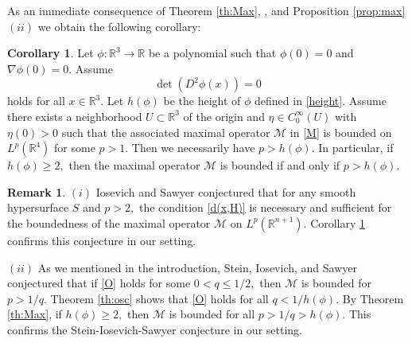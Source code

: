 \documentclass[a4paper, 11pt]{article}
\theoremstyle{plain}
\theoremstyle{definition}
\theoremstyle{lemma}
\theoremstyle{Remark}
\newtheorem{Remark}[theorem]{Remark}
\theoremstyle{proposition}
\theoremstyle{corollary}
\newtheorem{corollary}[theorem]{Corollary}
\theoremstyle{example}
\theoremstyle{assumption}
\begin{document}
  As an immediate consequence of Theorem \ref{th:Max}, \cite[Theorem 2]{Io.Saw}, and Proposition \ref{prop:max} $(ii)$ we obtain the following corollary:
  \begin{corollary}\label{cor:max}
  Let $\phi:\mathbb{R}^3\to \mathbb{R}$ be a polynomial such that $\phi(0)=0$ and $\nabla\phi(0)=0.$ Assume
$$\det(D^2\phi(x))=0$$
holds for all $x\in \mathbb{R}^3.$ Let $h(\phi)$ be the height of $\phi$ defined in \eqref{height}. Assume there exists a neighborhood $U\subset \mathbb{R}^3$ of the origin and  $\eta\in C^{\infty}_0(U)$ with $\eta(0)>0$ such that the associated maximal operator $\mathcal{M}$ in \eqref{M} is bounded
on  $L^p(\mathbb{R}^4)$ for some  $p> 1. $ Then we necessarily have  $p>h(\phi).$   In particular, if $h(\phi)\geq 2,$ then the maximal operator $\mathcal{M}$ is bounded if and only if $p>h(\phi).$
  \end{corollary}
  \begin{Remark}
   $(i)$ Iosevich and Sawyer \cite{Io.Saw} conjectured that for any smooth hypersurface $S$ and $p>2,$ the condition \eqref{d(x,H)} is necessary and sufficient for the boundedness of the maximal operator $\mathcal{M}$  on $L^p(\mathbb{R}^{n+1}). $ Corollary \ref{cor:max} confirms this conjecture in our setting. %

   $(ii)$ As we mentioned in the introduction,  Stein, Iosevich, and Sawyer  conjectured   that if \eqref{O} holds for some $0<q\leq 1/2,$ then  $\mathcal{M}$ is bounded for $p>1/q.$ Theorem \ref{th:osc} shows that \eqref{O} holds for all $q<1/h(\phi).$ By Theorem \ref{th:Max}, if $h(\phi)\geq 2,$ then   $\mathcal{M}$ is bounded for all $p>1/q>h(\phi).$ This confirms the Stein-Iosevich-Sawyer  conjecture in our setting.
  \end{Remark}
\end{document}
